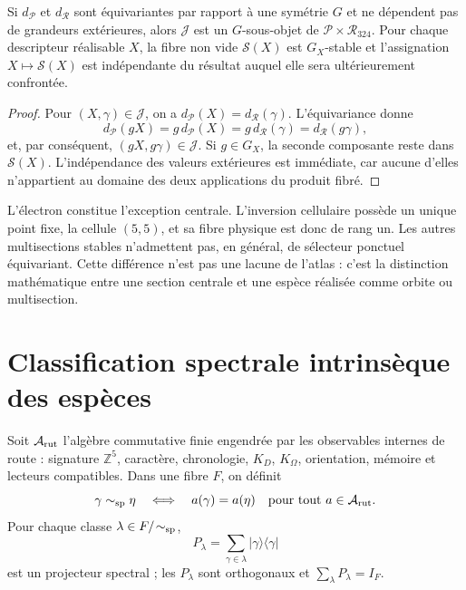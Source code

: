 \begin{theorem}
Si \(d_{\mathcal P}\) et \(d_{\mathcal R}\) sont équivariantes par rapport à une
symétrie \(G\) et ne dépendent pas de grandeurs extérieures, alors \(\mathcal J\)
est un \(G\)-sous-objet de \(\mathcal P\times\mathcal R_{324}\). Pour chaque
descripteur réalisable \(X\), la fibre non vide \(\mathscr S(X)\) est
\(G_X\)-stable et l'assignation \(X\mapsto\mathscr S(X)\) est indépendante du
résultat auquel elle sera ultérieurement confrontée.
\end{theorem}

\begin{proof}
Pour \((X,\gamma)\in\mathcal J\), on a
\(d_{\mathcal P}(X)=d_{\mathcal R}(\gamma)\). L'équivariance donne
\[
 d_{\mathcal P}(gX)=g\,d_{\mathcal P}(X)
 =g\,d_{\mathcal R}(\gamma)=d_{\mathcal R}(g\gamma),
\]
et, par conséquent, \((gX,g\gamma)\in\mathcal J\). Si \(g\in G_X\), la
seconde composante reste dans \(\mathscr S(X)\). L'indépendance des
valeurs extérieures est immédiate, car aucune d'elles n'appartient au domaine
des deux applications du produit fibré.
\end{proof}

L'électron constitue l'exception centrale. L'inversion cellulaire possède un
unique point fixe, la cellule \((5,5)\), et sa fibre physique est donc de rang
un. Les autres multisections stables n'admettent pas, en général, de sélecteur
ponctuel équivariant. Cette différence n'est pas une lacune de l'atlas : c'est la
distinction mathématique entre une section centrale et une espèce réalisée comme
orbite ou multisection.

\section{Classification spectrale intrinsèque des espèces}

Soit \(\mathcal A_{\rm rut}\) l'algèbre commutative finie engendrée par les
observables internes de route : signature \(\mathbb Z^5\), caractère, chronologie,
\(K_D\), \(K_\Omega\), orientation, mémoire et lecteurs compatibles. Dans une
fibre \(F\), on définit
\[
 \gamma\sim_{\rm sp}\eta
 \quad\Longleftrightarrow\quad
 a(\gamma)=a(\eta)\quad\text{pour tout }a\in\mathcal A_{\rm rut}.
\]
Pour chaque classe \(\lambda\in F/\!\sim_{\rm sp}\),
\[
 P_\lambda=\sum_{\gamma\in\lambda}
 |\gamma\rangle\langle\gamma|
\]
est un projecteur spectral ; les \(P_\lambda\) sont orthogonaux et
\(\sum_\lambda P_\lambda=I_F\).

